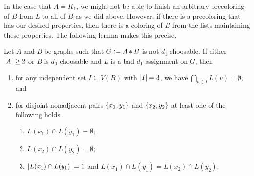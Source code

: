 In the case that $A = K_1$, we might not be able to finish an arbitrary
precoloring of $B$ from $L$ to all of $B$ as we did above.  However, if there is
a precoloring that has our desired properties, then there is a coloring of $B$
from the lists maintaining these properties.  The following lemma makes this
precise.

\begin{lem}\label{IntersectionsInB}
Let $A$ and $B$ be graphs such that $G \mathrel{\mathop:}=
A \mbox{\hspace{2 pt}$\ast$\hspace{2 pt}} B$ is not $d_1$-choosable.  If either $\left|A\right| \geq 2$ or $B$ is
$d_0$-choosable and $L$ is a bad $d_1$-assignment on $G$, then
\begin{enumerate}
\item for any independent set $I \subseteq V(B)$ with $\left|I\right| = 3$, we have
$\bigcap_{v \in I} L(v) = \emptyset$; and
\item for disjoint nonadjacent pairs $\left\{ x_1, y_1 \right\}$ and $\left\{ x_2, y_2 \right\}$ at least one of the following holds
	\begin{enumerate}
	\item $L(x_1) \cap L(y_1) = \emptyset$;
	\item $L(x_2) \cap L(y_2) = \emptyset$;
	\item $\left|L(x_1) \cap L(y_1)\right| = 1$ and $L(x_1) \cap L(y_1) = L(x_2) \cap L(y_2)$.
	\end{enumerate}
\end{enumerate}
\end{lem}
